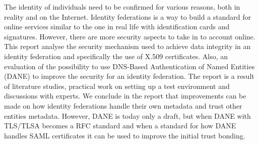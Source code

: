 The identity of individuals need to be confirmed for various reasons, both in reality and on the Internet. 
Identity federations is a way to build a standard for online services similar to the one in real life with identification cards and signatures.
However, there are more security aspects to take in to account online.
This report analyse the security mechanism used to achieve data integrity in an identity federation and specifically the use of X.509 certificates.
Also, an evaluation of the possibility to use DNS-Based Authentication of Named Entities (DANE) to improve the security for an identity federation.
The report is a result of literature studies, practical work on setting up a test environment and discussions with experts.
We conclude in the report that improvements can be made on how identity federations handle their own metadata and trust other entities metadata. 
However, DANE is today only a draft, but when DANE with TLS/TLSA becomes a RFC standard and when a standard for how DANE handles SAML certificates it can be used to improve the initial trust bonding.








